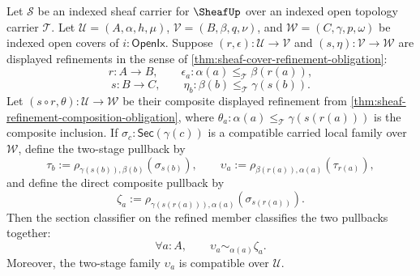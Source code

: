 \begin{corollary}
\label{cor:sheaf-carried-section-pullback-composite-associativity}
Let $\mathcal{S}$ be an indexed sheaf carrier for $\SheafUp$ over an indexed open topology carrier $\mathcal{T}$. Let $\mathcal{U}=(A,\alpha,h,\mu)$, $\mathcal{V}=(B,\beta,q,\nu)$, and $\mathcal{W}=(C,\gamma,p,\omega)$ be indexed open covers of $i:\mathsf{OpenIx}$. Suppose $(r,\epsilon):\mathcal{U}\to\mathcal{V}$ and $(s,\eta):\mathcal{V}\to\mathcal{W}$ are displayed refinements in the sense of \autoref{thm:sheaf-cover-refinement-obligation}:
$$
r:A\to B,
\qquad
\epsilon_a:\alpha(a)\le_{\mathcal{T}}\beta(r(a)),
$$
$$
s:B\to C,
\qquad
\eta_b:\beta(b)\le_{\mathcal{T}}\gamma(s(b)).
$$
Let $(s\circ r,\theta):\mathcal{U}\to\mathcal{W}$ be their composite displayed refinement from \autoref{thm:sheaf-refinement-composition-obligation}, where $\theta_a:\alpha(a)\le_{\mathcal{T}}\gamma(s(r(a)))$ is the composite inclusion. If $\sigma_c:\mathsf{Sec}(\gamma(c))$ is a compatible carried local family over $\mathcal{W}$, define the two-stage pullback by
$$
\tau_b:=\rho_{\gamma(s(b)),\beta(b)}(\sigma_{s(b)}),
\qquad
\upsilon_a:=\rho_{\beta(r(a)),\alpha(a)}(\tau_{r(a)}),
$$
and define the direct composite pullback by
$$
\zeta_a:=\rho_{\gamma(s(r(a))),\alpha(a)}(\sigma_{s(r(a))}).
$$
Then the section classifier on the refined member classifies the two pullbacks together:
$$
\forall a:A,
\qquad
\upsilon_a\sim_{\alpha(a)}\zeta_a.
$$
Moreover, the two-stage family $\upsilon_a$ is compatible over $\mathcal{U}$.
\end{corollary}
